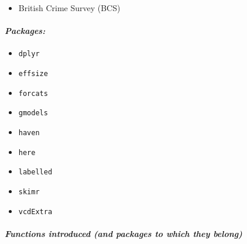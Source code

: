 \documentclass[
]{book}
\providecommand{\tightlist}{%
  \setlength{\itemsep}{0pt}\setlength{\parskip}{0pt}}
\begin{document}
\begin{itemize}
\tightlist
\item
  British Crime Survey (BCS)
\end{itemize}

\hypertarget{packages-7}{%
\paragraph*{\texorpdfstring{\emph{Packages:}}{Packages:}}\label{packages-7}}

\begin{itemize}
\tightlist
\item
  \texttt{dplyr}
\item
  \texttt{effsize}
\item
  \texttt{forcats}
\item
  \texttt{gmodels}
\item
  \texttt{haven}
\item
  \texttt{here}
\item
  \texttt{labelled}
\item
  \texttt{skimr}
\item
  \texttt{vcdExtra}
\end{itemize}

\hypertarget{functions-introduced-and-packages-to-which-they-belong-6}{%
\paragraph*{\texorpdfstring{\emph{Functions introduced (and packages to which they belong)}}{Functions introduced (and packages to which they belong)}}\label{functions-introduced-and-packages-to-which-they-belong-6}}
\end{document}
